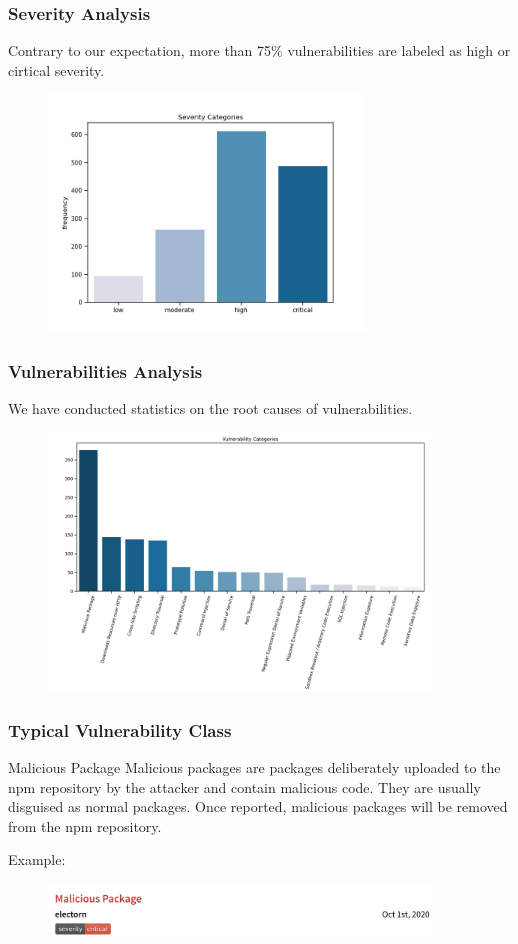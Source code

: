\documentclass[notheorems, aspectratio=54]{beamer}
\begin{document}
\begin{frame}
    \frametitle{Severity Analysis}
    Contrary to our expectation, more than 75\% vulnerabilities are labeled as high or cirtical severity.
    \begin{figure}
        \centering
        \includegraphics[width=3.3in]{./figures/severity.png}
        \centering
    \end{figure}
\end{frame}

\begin{frame}
    \frametitle{Vulnerabilities Analysis}
    We have conducted statistics on the root causes of vulnerabilities.
    \begin{figure}
        \centering
        \includegraphics[width=4in]{./figures/vulnerabilities.png}
    \end{figure}
\end{frame}

\begin{frame}
    \frametitle{Typical Vulnerability Class}
    \begin{block}{Malicious Package}
        Malicious packages are packages deliberately uploaded to the npm repository by the attacker and contain malicious code. They are usually disguised as normal packages. Once reported, malicious packages will be removed from the npm repository.

        Example: 
        \begin{figure}
            \centering
            \includegraphics[width=4in]{./figures/malicious.png}
        \end{figure}
    \end{block}

\end{frame}
\end{document}
